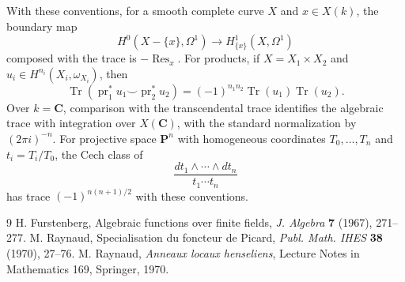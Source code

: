 \documentclass[11pt]{article}
\theoremstyle{remark}
\DeclareMathOperator{\Res}{Res}
\newcommand{\C}{\mathbf C}
\DeclareMathOperator{\Tr}{Tr}
\begin{document}
With these conventions, for a smooth complete curve $X$ and $x\in X(k)$, the boundary map
\[
 H^0(X-\{x\},\Omega^1)\to H^1_{\{x\}}(X,\Omega^1)
\]
composed with the trace is $-\Res_x$. For products, if $X=X_1\times X_2$ and $u_i\in H^{n_i}(X_i,\omega_{X_i})$, then
\[
 \Tr(\operatorname{pr}_1^*u_1\smile\operatorname{pr}_2^*u_2)
 =(-1)^{n_1n_2}\Tr(u_1)\Tr(u_2).
\]
Over $k=\C$, comparison with the transcendental trace identifies the algebraic trace with integration over $X(\C)$, with the standard normalization by $(2\pi i)^{-n}$. For projective space $\mathbf P^n$ with homogeneous coordinates $T_0,\ldots,T_n$ and $t_i=T_i/T_0$, the Cech class of
\[
 \frac{dt_1\wedge\cdots\wedge dt_n}{t_1\cdots t_n}
\]
has trace $(-1)^{n(n+1)/2}$ with these conventions.

\begin{thebibliography}{9}
 H. Furstenberg, Algebraic functions over finite fields, \emph{J. Algebra} \textbf{7} (1967), 271--277.
 M. Raynaud, Specialisation du foncteur de Picard, \emph{Publ. Math. IHES} \textbf{38} (1970), 27--76.
 M. Raynaud, \emph{Anneaux locaux henseliens}, Lecture Notes in Mathematics 169, Springer, 1970.
\end{thebibliography}
\end{document}
